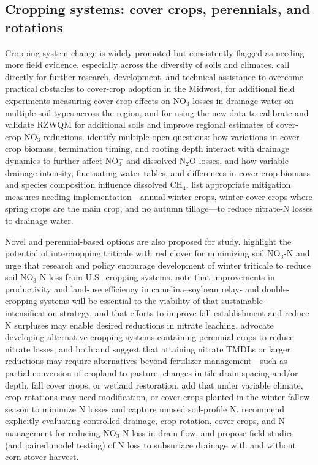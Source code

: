 \documentclass[11pt]{article}
\begin{document}
\subsection{Cropping systems: cover crops, perennials, and rotations}
Cropping-system change is widely promoted but consistently flagged as needing more field evidence, especially across the diversity of soils and climates. \textcite{Kladivko2014} call directly for further research, development, and technical assistance to overcome practical obstacles to cover-crop adoption in the Midwest, for additional field experiments measuring cover-crop effects on NO$_3$ losses in drainage water on multiple soil types across the region, and for using the new data to calibrate and validate RZWQM for additional soils and improve regional estimates of cover-crop NO$_3$ reductions. \textcite{Oliveira2025} identify multiple open questions: how variations in cover-crop biomass, termination timing, and rooting depth interact with drainage dynamics to further affect NO$_3^-$ and dissolved N$_2$O losses, and how variable drainage intensity, fluctuating water tables, and differences in cover-crop biomass and species composition influence dissolved CH$_4$. \textcite{Lagzdins2015} list appropriate mitigation measures needing implementation---annual winter crops, winter cover crops where spring crops are the main crop, and no autumn tillage---to reduce nitrate-N losses to drainage water.

Novel and perennial-based options are also proposed for study. \textcite{Nance2007} highlight the potential of intercropping triticale with red clover for minimizing soil NO$_3$-N and urge that research and policy encourage development of winter triticale to reduce soil NO$_3$-N loss from U.S.\ cropping systems. \textcite{Emmett2022} note that improvements in productivity and land-use efficiency in camelina--soybean relay- and double-cropping systems will be essential to the viability of that sustainable-intensification strategy, and that efforts to improve fall establishment and reduce N surpluses may enable desired reductions in nitrate leaching. \textcite{Randall2001} advocate developing alternative cropping systems containing perennial crops to reduce nitrate losses, and both \textcite{Gowda2007} and \textcite{Nangia2008} suggest that attaining nitrate TMDLs or larger reductions may require alternatives beyond fertilizer management---such as partial conversion of cropland to pasture, changes in tile-drain spacing and/or depth, fall cover crops, or wetland restoration. \textcite{Kaur2024c} add that under variable climate, crop rotations may need modification, or cover crops planted in the winter fallow season to minimize N losses and capture unused soil-profile N. \textcite{Ma2007b} recommend explicitly evaluating controlled drainage, crop rotation, cover crops, and N management for reducing NO$_3$-N loss in drain flow, and \textcite{Malone2019} propose field studies (and paired model testing) of N loss to subsurface drainage with and without corn-stover harvest.
\end{document}
